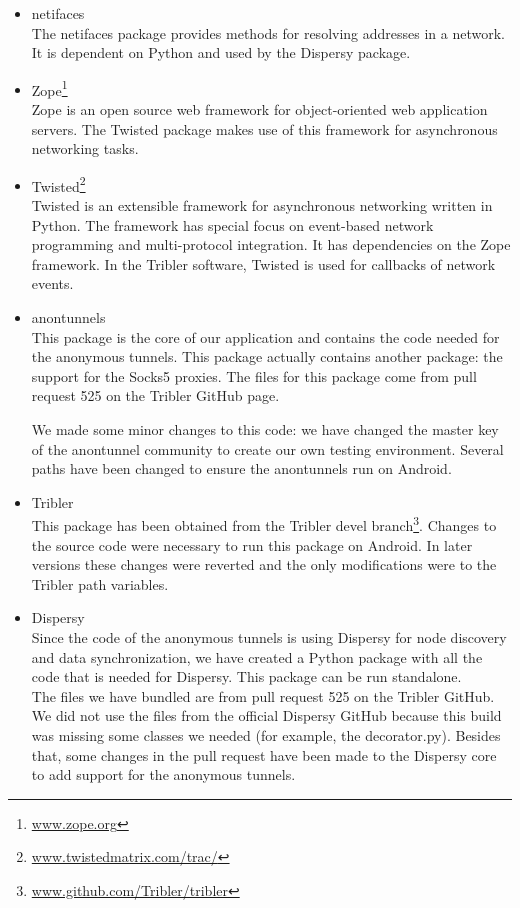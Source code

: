 \begin{itemize}
			\item netifaces\\
			The netifaces package provides methods for resolving addresses in a network. It is dependent on Python and used by the Dispersy package.
		
			\item Zope\footnote{\href{http://www.zope.org/}{www.zope.org}}\\
			Zope is an open source web framework for object-oriented web application servers. The Twisted package makes use of this framework for asynchronous networking tasks.
		
			\item Twisted\footnote{\href{https://twistedmatrix.com/trac/}{www.twistedmatrix.com/trac/}}\\
			Twisted is an extensible framework for asynchronous networking written in Python. The framework has special focus on event-based network programming and multi-protocol integration. It has dependencies on the Zope framework. In the Tribler software, Twisted is used for callbacks of network events.
		
			\item anontunnels\\
			This package is the core of our application and contains the code needed for the anonymous tunnels. This package actually contains another package: the support for the Socks5 proxies. The files for this package come from pull request 525 on the Tribler GitHub page.
			
			We made some minor changes to this code: we have changed the master key of the anontunnel community to create our own testing environment. Several paths have been changed to ensure the anontunnels run on Android.
			
			\item Tribler\\
			This package has been obtained from the Tribler devel branch\footnote{\href{https://github.com/Tribler/tribler}{www.github.com/Tribler/tribler}}. Changes to the source code were necessary to run this package on Android. In later versions these changes were reverted and the only modifications were to the Tribler path variables.
			
			\item Dispersy\\
			Since the code of the anonymous tunnels is using Dispersy for node discovery and data synchronization, we have created a Python package with all the code that is needed for Dispersy. This package can be run standalone.\\
			The files we have bundled are from pull request 525 on the Tribler GitHub. We did not use the files from the official Dispersy GitHub because this build was missing some classes we needed (for example, the decorator.py). Besides that, some changes in the pull request have been made to the Dispersy core to add support for the anonymous tunnels.
		
		\end{itemize}
	
